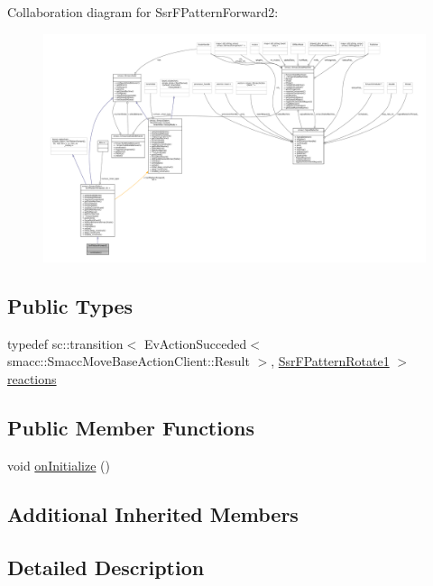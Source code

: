 Collaboration diagram for Ssr\+F\+Pattern\+Forward2\+:
\nopagebreak
\begin{figure}[H]
\begin{center}
\leavevmode
\includegraphics[width=350pt]{structSsrFPatternForward2__coll__graph}
\end{center}
\end{figure}
\subsection*{Public Types}
\begin{DoxyCompactItemize}
\item 
typedef sc\+::transition$<$ Ev\+Action\+Succeded$<$ smacc\+::\+Smacc\+Move\+Base\+Action\+Client\+::\+Result $>$, \hyperlink{structSsrFPatternRotate1}{Ssr\+F\+Pattern\+Rotate1} $>$ \hyperlink{structSsrFPatternForward2_afc14834e634fa4fc628a1e283898ca1d}{reactions}
\end{DoxyCompactItemize}
\subsection*{Public Member Functions}
\begin{DoxyCompactItemize}
\item 
void \hyperlink{structSsrFPatternForward2_a81c19ada428b305cef1e21f39a090fa8}{on\+Initialize} ()
\end{DoxyCompactItemize}
\subsection*{Additional Inherited Members}


\subsection{Detailed Description}


